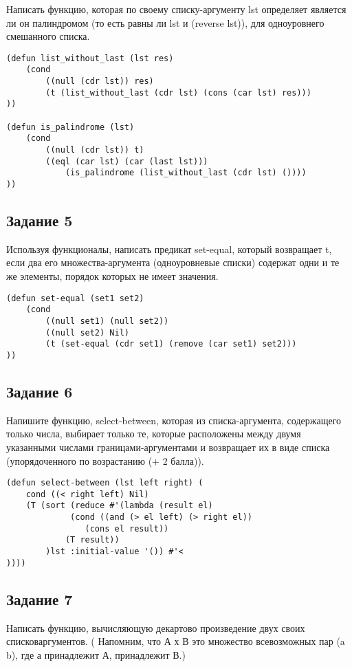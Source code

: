 Написать функцию, которая по своему списку-аргументу lst определяет является ли он палиндромом (то есть равны ли lst и (reverse lst)), для одноуровнего смешанного списка.

\begin{lstlisting}
(defun list_without_last (lst res)
	(cond
		((null (cdr lst)) res)
		(t (list_without_last (cdr lst) (cons (car lst) res)))
))

(defun is_palindrome (lst)
	(cond 
		((null (cdr lst)) t)
		((eql (car lst) (car (last lst)))
			(is_palindrome (list_without_last (cdr lst) ())))
))
\end{lstlisting}

\subsection*{Задание 5}

Используя функционалы, написать предикат set-equal, который возвращает t, если два его множества-аргумента (одноуровневые списки) содержат одни и те же элементы, порядок которых не имеет значения.
\begin{lstlisting}
(defun set-equal (set1 set2)
	(cond 
		((null set1) (null set2)) 
		((null set2) Nil) 
		(t (set-equal (cdr set1) (remove (car set1) set2)))
))
\end{lstlisting}

\subsection*{Задание 6}

Напишите функцию, select-between, которая из списка-аргумента, содержащего только числа, выбирает только те, которые расположены между двумя указанными числами  границами-аргументами и возвращает их в виде списка (упорядоченного по возрастанию (+ 2 балла)).

\begin{lstlisting}
(defun select-between (lst left right) (
    cond ((< right left) Nil)
    (T (sort (reduce #'(lambda (result el)
             (cond ((and (> el left) (> right el))
                (cons el result))
            (T result))
        )lst :initial-value '()) #'<
))))
\end{lstlisting}

\subsection*{Задание 7}

Написать функцию, вычисляющую декартово произведение двух своих списковаргументов. ( Напомним, что А х В это множество всевозможных пар (a b), где а принадлежит А, принадлежит В.)


